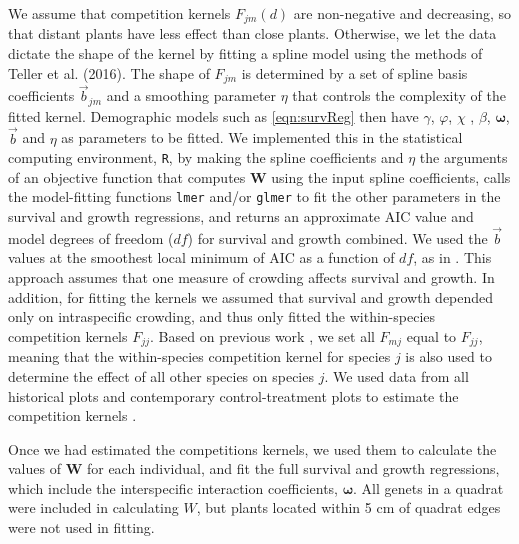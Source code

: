 \documentclass[11pt]{article}
\begin{document}
\begin{doublespacing}
We assume that competition kernels $F_{jm}(d)$ are non-negative and decreasing, so that distant plants have less effect than close plants. Otherwise, we let the data dictate the shape of the kernel by fitting a spline model 
using the methods of Teller et al. (2016). The shape of $F_{jm}$ is determined by a set of spline basis coefficients $\vec{b}_{jm}$
and a smoothing parameter $\eta$ that controls the complexity of the fitted kernel. 
Demographic models such as \eqref{eqn:survReg} then have $\gamma$, $\varphi$, $\chi$ , 
$\beta$, $\boldsymbol{\omega}$, $\vec{b}$ and $\eta$ as parameters to be fitted. We implemented this in the statistical computing environment, \texttt{R}, 
by making the spline coefficients and $\eta$ the arguments of an objective function that computes $\boldsymbol{W}$ using the input spline coefficients, 
calls the model-fitting functions \texttt{lmer} and/or \texttt{glmer} to fit the other parameters in the survival and growth regressions, 
and returns an approximate AIC value and model degrees of freedom ($df$) for survival and growth combined. We used the $\vec{b}$ values at the smoothest 
local minimum of AIC as a function of $df$, as in \cite{teller_linking_2016}. This approach assumes that one measure of crowding affects 
survival and growth. In addition, for fitting the kernels we assumed that survival and growth depended only on intraspecific crowding, and thus only fitted the
within-species competition kernels $F_{jj}$. Based on previous work \citep{adler_coexistence_2010}, we set all $F_{mj}$ equal to $F_{jj}$, meaning that 
the within-species competition kernel for species $j$ is also used to determine the effect of all other species on species $j$. We used data from all historical plots and contemporary control-treatment plots to estimate the competition kernels \citep{adler_in_prep}. 

Once we had estimated the competitions kernels, we used them to calculate the values of $\boldsymbol{W}$ for each individual, 
and fit the full survival and growth regressions, which include the interspecific interaction coefficients, $\boldsymbol{\omega}$. 
All genets in a quadrat were included in calculating $W$, but plants located within 5 cm of quadrat edges were not used in fitting. 


\end{doublespacing}
\end{document}
